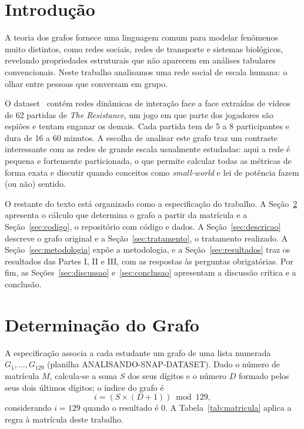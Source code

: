 \documentclass[sigconf]{webmedia}
\begin{document}
\section{Introdução}
A teoria dos grafos fornece uma linguagem comum para modelar fenômenos muito distintos, como redes sociais, redes de transporte e sistemas biológicos, revelando propriedades estruturais que não aparecem em análises tabulares convencionais. Neste trabalho analisamos uma rede social de escala humana: o olhar entre pessoas que conversam em grupo.

O dataset~\cite{kumar2021,bai2019} contém redes dinâmicas de interação face a face extraídas de vídeos de 62 partidas de \textit{The Resistance}, um jogo em que parte dos jogadores são espiões e tentam enganar os demais. Cada partida tem de 5 a 8 participantes e dura de 16 a 60 minutos. A escolha de analisar este grafo traz um contraste interessante com as redes de grande escala usualmente estudadas: aqui a rede é pequena e fortemente particionada, o que permite calcular todas as métricas de forma exata e discutir quando conceitos como \textit{small-world} e lei de potência fazem (ou não) sentido.

O restante do texto está organizado como a especificação do trabalho. A Seção~\ref{sec:determinacao} apresenta o cálculo que determina o grafo a partir da matrícula e a Seção~\ref{sec:codigo}, o repositório com código e dados. A Seção~\ref{sec:descricao} descreve o grafo original e a Seção~\ref{sec:tratamento}, o tratamento realizado. A Seção~\ref{sec:metodologia} expõe a metodologia, e a Seção~\ref{sec:resultados} traz os resultados das Partes I, II e III, com as respostas às perguntas obrigatórias. Por fim, as Seções~\ref{sec:discussao} e~\ref{sec:conclusao} apresentam a discussão crítica e a conclusão.

\section{Determinação do Grafo}
\label{sec:determinacao}
A especificação associa a cada estudante um grafo de uma lista numerada $G_1, \dots, G_{129}$ (planilha ANALISANDO-SNAP-DATASET). Dado o número de matrícula $M$, calcula-se a soma $S$ dos seus dígitos e o número $D$ formado pelos seus dois últimos dígitos; o índice do grafo é
\[
  i = (S \times (D + 1)) \bmod 129,
\]
considerando $i = 129$ quando o resultado é 0. A Tabela~\ref{tab:matricula} aplica a regra à matrícula deste trabalho.
\end{document}
